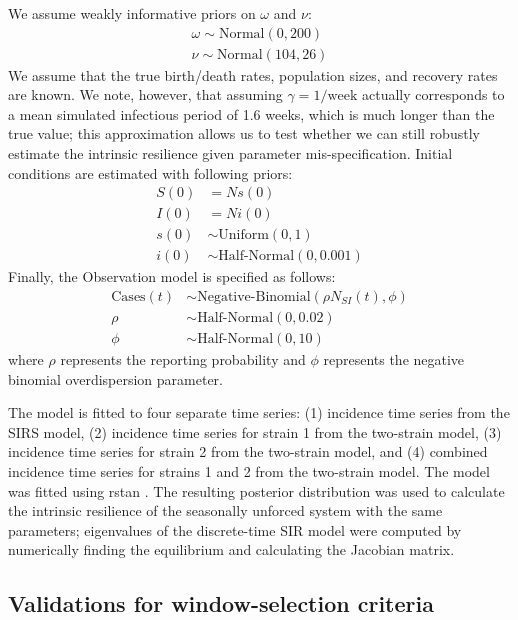 \documentclass[12pt]{article}
\begin{document}
We assume weakly informative priors on $\omega$ and $\nu$:
\begin{align}
\omega \sim \mathrm{Normal}(0, 200)\\
\nu \sim \mathrm{Normal}(104, 26)
\end{align}
We assume that the true birth/death rates, population sizes, and recovery rates are known.
We note, however, that assuming $\gamma=1/\mathrm{week}$ actually corresponds to a mean simulated infectious period of 1.6 weeks, which is much longer than the true value; this approximation allows us to test whether we can still robustly estimate the intrinsic resilience given parameter mis-specification.
Initial conditions are estimated with following priors:
\begin{align}
S(0) &= N s(0)\\
I(0) &= N i(0)\\
s(0) &\sim \textrm{Uniform}(0, 1)\\
i(0) &\sim \textrm{Half-Normal}(0, 0.001)
\end{align}
Finally, the Observation model is specified as follows:
\begin{align}
\textrm{Cases}(t) &\sim \textrm{Negative-Binomial}(\rho N_{SI}(t), \phi)\\
\rho &\sim \textrm{Half-Normal}(0, 0.02)\\
\phi &\sim \textrm{Half-Normal}(0, 10)
\end{align}
where $\rho$ represents the reporting probability and $\phi$ represents the negative binomial overdispersion parameter.

The model is fitted to four separate time series: (1) incidence time series from the SIRS model, (2) incidence time series for strain 1 from the two-strain model, (3) incidence time series for strain 2 from the two-strain model, and (4) combined incidence time series for strains 1 and 2 from the two-strain model.
The model was fitted using rstan \citep{carpenter2017stan,rstan}.
The resulting posterior distribution was used to calculate the intrinsic resilience of the seasonally unforced system with the same parameters;
eigenvalues of the discrete-time SIR model were computed by numerically finding the equilibrium and calculating the Jacobian matrix.

\subsection*{Validations for window-selection criteria}
\end{document}
